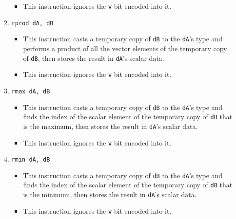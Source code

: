 \documentclass{article}
\begin{document}
\begin{itemize}
\begin{enumerate}
\begin{itemize}
				\item This instruction ignores the \texttt{v} bit encoded
				into it.
				\end{itemize}
			\item \texttt{rprod dA, dB}
				\begin{itemize}
				\item This instruction casts a temporary copy of
				\texttt{dB} to the \texttt{dA}'s type and performs a
				product of all the vector elements of the temporary copy of
				\texttt{dB}, then stores the result in \texttt{dA}'s scalar
				data.

				\item This instruction ignores the \texttt{v} bit encoded
				into it.
				\end{itemize}
			\item \texttt{rmax dA, dB}
				\begin{itemize}
				\item This instruction casts a temporary copy of
				\texttt{dB} to the \texttt{dA}'s type and finds the index
				of the scalar element of the temporary copy of
				\texttt{dB} that is the maximum, then stores the result in
				\texttt{dA}'s scalar data.

				\item This instruction ignores the \texttt{v} bit encoded
				into it.
				\end{itemize}
			\item \texttt{rmin dA, dB}
				\begin{itemize}
				\item This instruction casts a temporary copy of
				\texttt{dB} to the \texttt{dA}'s type and finds the index
				of the scalar element of the temporary copy of
				\texttt{dB} that is the minimum, then stores the result in
				\texttt{dA}'s scalar data.

				\item This instruction ignores the \texttt{v} bit encoded
				into it.
				\end{itemize}
			\end{enumerate}
		\end{itemize}
		\newpage
\end{document}
